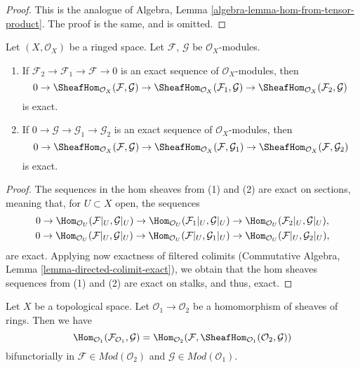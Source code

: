 \begin{proof}
This is the analogue of
Algebra, Lemma \ref{algebra-lemma-hom-from-tensor-product}.
The proof is the same, and is omitted.
\end{proof}

\begin{lemma}
\label{lemma-internal-hom-exact}
Let $(X, \mathcal{O}_X)$ be a ringed space.
Let $\mathcal{F}$, $\mathcal{G}$ be $\mathcal{O}_X$-modules.
\begin{enumerate}
\item If $\mathcal{F}_2 \to \mathcal{F}_1 \to \mathcal{F} \to 0$
is an exact sequence of $\mathcal{O}_X$-modules, then
$$
0 \to
\SheafHom_{\mathcal{O}_X}(\mathcal{F}, \mathcal{G}) \to
\SheafHom_{\mathcal{O}_X}(\mathcal{F}_1, \mathcal{G}) \to
\SheafHom_{\mathcal{O}_X}(\mathcal{F}_2, \mathcal{G})
$$
is exact.
\item If $0 \to \mathcal{G} \to \mathcal{G}_1 \to \mathcal{G}_2$
is an exact sequence of $\mathcal{O}_X$-modules, then
$$
0 \to
\SheafHom_{\mathcal{O}_X}(\mathcal{F}, \mathcal{G}) \to
\SheafHom_{\mathcal{O}_X}(\mathcal{F}, \mathcal{G}_1) \to
\SheafHom_{\mathcal{O}_X}(\mathcal{F}, \mathcal{G}_2)
$$
is exact.
\end{enumerate}
\end{lemma}

\begin{proof}
	The sequences in the hom sheaves from (1) and (2) are exact on sections,
	meaning that, for $U\subset X$ open, the sequences
	\begin{gather*}
		0\to\Hom_{\mathcal{O}_U}(\mathcal{F}|_U,\mathcal{G}|_U)\to
		\Hom_{\mathcal{O}_U}(\mathcal{F}_1|_U,\mathcal{G}|_U)\to
		\Hom_{\mathcal{O}_U}(\mathcal{F}_2|_U,\mathcal{G}|_U),\\
		0\to\Hom_{\mathcal{O}_U}(\mathcal{F}|_U,\mathcal{G}|_U)\to
		\Hom_{\mathcal{O}_U}(\mathcal{F}|_U,\mathcal{G}_1|_U)\to
		\Hom_{\mathcal{O}_U}(\mathcal{F}|_U,\mathcal{G}_2|_U),
	\end{gather*}
	are exact. Applying now exactness of filtered colimits (Commutative Algebra, Lemma \ref{lemma-directed-colimit-exact}),
	we obtain that the hom sheaves sequences from (1) and (2) are
	exact on stalks, and thus, exact.
\end{proof}

\begin{lemma}
\label{lemma-adjoint-tensor-restrict}
Let $X$ be a topological space. Let $\mathcal{O}_1 \to \mathcal{O}_2$
be a homomorphism of sheaves of rings. Then we have
$$
\Hom_{\mathcal{O}_1}(\mathcal{F}_{\mathcal{O}_1}, \mathcal{G}) =
\Hom_{\mathcal{O}_2}(\mathcal{F},
\SheafHom_{\mathcal{O}_1}(\mathcal{O}_2, \mathcal{G}))
$$
bifunctorially in $\mathcal{F} \in \textit{Mod}(\mathcal{O}_2)$
and $\mathcal{G} \in \textit{Mod}(\mathcal{O}_1)$.
\end{lemma}

